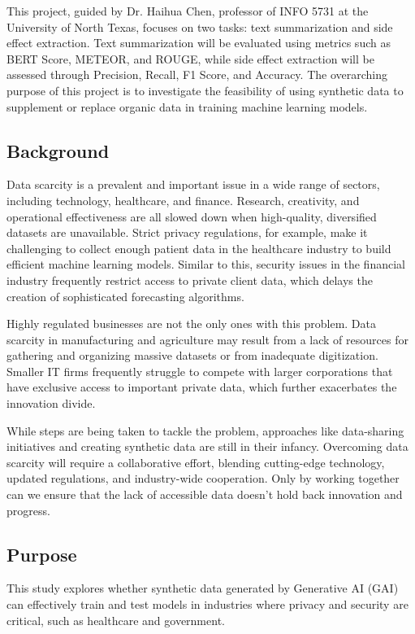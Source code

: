 \documentclass[sigplan,screen]{acmart}
\begin{document}
This project, guided by Dr. Haihua Chen, professor of INFO 5731 at the University of North Texas, focuses on two tasks: text summarization and side effect extraction. Text summarization will be evaluated using metrics such as BERT Score, METEOR, and ROUGE, while side effect extraction will be assessed through Precision, Recall, F1 Score, and Accuracy. The overarching purpose of this project is to investigate the feasibility of using synthetic data to supplement or replace organic data in training machine learning models.

\subsection{Background}
Data scarcity is a prevalent and important issue in a wide range of sectors, including technology, healthcare, and finance. Research, creativity, and operational effectiveness are all slowed down when high-quality, diversified datasets are unavailable. Strict privacy regulations, for example, make it challenging to collect enough patient data in the healthcare industry to build efficient machine learning models. Similar to this, security issues in the financial industry frequently restrict access to private client data, which delays the creation of sophisticated forecasting algorithms.


Highly regulated businesses are not the only ones with this problem. Data scarcity in manufacturing and agriculture may result from a lack of resources for gathering and organizing massive datasets or from inadequate digitization. Smaller IT firms frequently struggle to compete with larger corporations that have exclusive access to important private data, which further exacerbates the innovation divide.

While steps are being taken to tackle the problem, approaches like data-sharing initiatives and creating synthetic data are still in their infancy. Overcoming data scarcity will require a collaborative effort, blending cutting-edge technology, updated regulations, and industry-wide cooperation. Only by working together can we ensure that the lack of accessible data doesn’t hold back innovation and progress.

\subsection{Purpose}

This study explores whether synthetic data generated by Generative AI (GAI) can effectively train and test models in industries where privacy and security are critical, such as healthcare and government.
\end{document}
